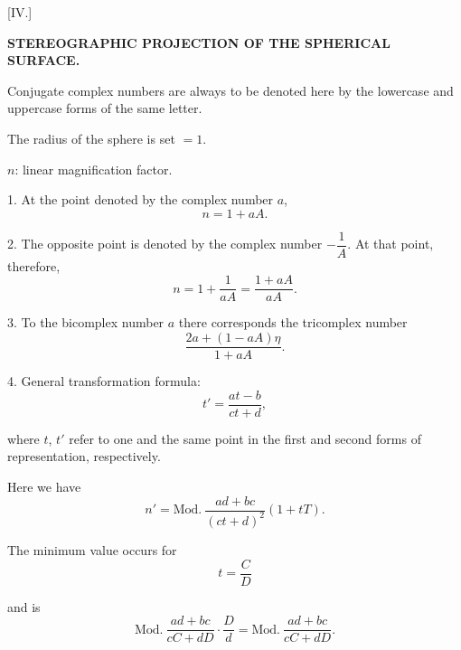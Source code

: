 
\begin{center}
[IV.]
\end{center}

\begin{center}
\bfseries STEREOGRAPHIC PROJECTION OF THE SPHERICAL SURFACE.
\end{center}

Conjugate complex numbers are always to be denoted here by the lowercase and uppercase forms of the same letter.

The radius of the sphere is set $=1$.

$n$: linear magnification factor.

1. At the point denoted by the complex number $a$,
\[
n = 1+aA.
\]

2. The opposite point is denoted by the complex number $-\dfrac{1}{A}$. At that point, therefore,
\[
n = 1+\frac{1}{aA} = \frac{1+aA}{aA}.
\]

3. To the bicomplex number $a$ there corresponds the tricomplex number
\[
\frac{2a+(1-aA)\eta}{1+aA}.
\]

4. General transformation formula:
\[
t' = \frac{at-b}{ct+d},
\]

where $t$, $t'$ refer to one and the same point in the first and second forms of representation, respectively.

Here we have
\[
n' = \text{Mod.}\ \frac{ad+bc}{(ct+d)^2}(1+tT).
\]

The minimum value occurs for
\[
t = \frac{C}{D}
\]

\noindent and is
\[
\text{Mod.}\ \frac{ad+bc}{cC+dD}\cdot\frac{D}{d} = \text{Mod.}\ \frac{ad+bc}{cC+dD}.
\]
